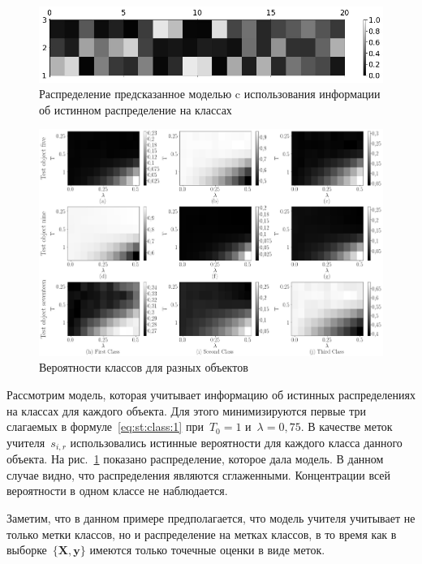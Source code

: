 \begin{figure}[!ht]\center
\includegraphics[width=1\textwidth]{results/privlearn/syn_with_teacher_distr}
\caption{Распределение предсказанное моделью c использования информации об истинном распределение на классах}
\label{fg:ex:synt:distr:with}
\end{figure}

\begin{figure}[!ht]\center
\includegraphics[width=1\textwidth]{results/privlearn/syn_T_lambda}
\caption{Вероятности классов для разных объектов}
\label{fg:ex:synt:distr:lambda_T}
\end{figure}

Рассмотрим модель, которая учитывает информацию об истинных распределениях на классах для каждого объекта. Для этого минимизируются первые три слагаемых в формуле~\eqref{eq:st:class:1} при~$T_0=1$ и~$\lambda=0{,}75$. В качестве меток учителя~$s_{i,r}$ использовались истинные вероятности для каждого класса данного объекта. На рис.~\ref{fg:ex:synt:distr:with} показано распределение, которое дала модель. В данном случае видно, что распределения являются сглаженными. Концентрации всей вероятности в одном классе не наблюдается.

Заметим, что в данном примере предполагается, что модель учителя учитывает не только метки классов, но и распределение на метках классов, в то время как в выборке~$\{\mathbf{X}, \mathbf{y}\}$ имеются только точечные оценки в виде меток. 

